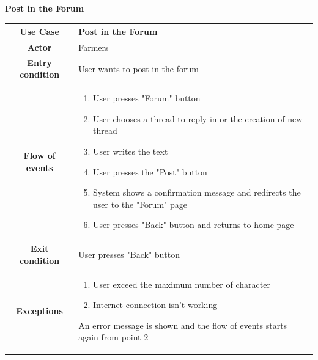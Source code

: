 \documentclass[table, 12pt]{article}
\begin{document}
\begin{itemize}
            \begin{table}[H]
                \item[] \textbf{Post in the Forum}
                \item[] 
                \centering
                \begin{tabular}{|c| m{}|}
                    \hline
                    \textbf{Use Case} & Post in the Forum\\ \hline
                    \textbf{Actor} & Farmers\\ \hline
                    \textbf{Entry condition} & User wants to post in the forum\\  \hline
                    \textbf{Flow of events} & \begin{enumerate}
                                                \item User presses "Forum" button
                                                \item User chooses a thread to reply in or the creation of new thread
                                                \item User writes the text
                                                \item User presses the "Post" button
                                                \item System shows a confirmation message and redirects the user to the "Forum" page
                                                \item User presses "Back" button and returns to home page 
                                            \end{enumerate}\\ \hline
                    \textbf{Exit condition} & User presses "Back" button\\ \hline
                    \textbf{Exceptions} &  \begin{enumerate}
                        \item User exceed the maximum number of character 
                        \item Internet connection isn't working
                    \end{enumerate}
                    An error message is shown and the flow of events starts again from point 2\\ \hline                    
                \end{tabular}
            \end{table}


\end{itemize}
\end{document}
